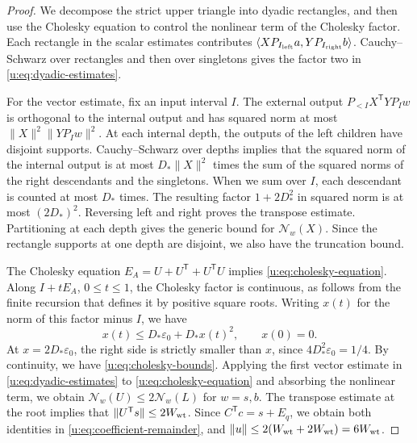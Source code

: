 \begin{proof}
We decompose the strict upper triangle into dyadic rectangles, and then use the Cholesky equation to control the nonlinear term of the Cholesky factor. Each rectangle in the scalar estimates contributes
$\langle XP_{I_{\rm left}}a,YP_{I_{\rm right}}b\rangle$.
Cauchy--Schwarz over rectangles and then over singletons gives the factor two in \eqref{u:eq:dyadic-estimates}.

For the vector estimate, fix an input interval $I$. The external output $P_{<I}X^{\mathsf T}YP_Iw$ is orthogonal to the internal output and has squared norm at most $\|X\|^2\|YP_Iw\|^2$. At each internal depth, the outputs of the left children have disjoint supports. Cauchy--Schwarz over depths implies that the squared norm of the internal output is at most $D_*\|X\|^2$ times the sum of the squared norms of the right descendants and the singletons. When we sum over $I$, each descendant is counted at most $D_*$ times. The resulting factor $1+2D_*^2$ in squared norm is at most $(2D_*)^2$. Reversing left and right proves the transpose estimate. Partitioning at each depth gives the generic bound for $\mathcal N_w(X)$. Since the rectangle supports at one depth are disjoint, we also have the truncation bound.

The Cholesky equation $E_A=U+U^{\mathsf T}+U^{\mathsf T}U$ implies \eqref{u:eq:cholesky-equation}. Along $I+tE_A$, $0\le t\le1$, the Cholesky factor is continuous, as follows from the finite recursion that defines it by positive square roots. Writing $x(t)$ for the norm of this factor minus $I$, we have
\[
 x(t)\le D_*\varepsilon_0+D_*x(t)^2,\qquad x(0)=0.
\]
At $x=2D_*\varepsilon_0$, the right side is strictly smaller than $x$, since $4D_*^2\varepsilon_0=1/4$. By continuity, we have \eqref{u:eq:cholesky-bounds}.
Applying the first vector estimate in \eqref{u:eq:dyadic-estimates} to \eqref{u:eq:cholesky-equation} and absorbing the nonlinear term, we obtain $\mathcal N_w(U)\le2\mathcal N_w(L)$ for $w=s,b$. The transpose estimate at the root implies that $\|U^{\mathsf T}s\|\le2W_{\rm wt}$. Since $C^{\mathsf T}c=s+E_q$, we obtain both identities in \eqref{u:eq:coefficient-remainder}, and $\|u\|\le2(W_{\rm wt}+2W_{\rm wt})=6W_{\rm wt}$.
\end{proof}

